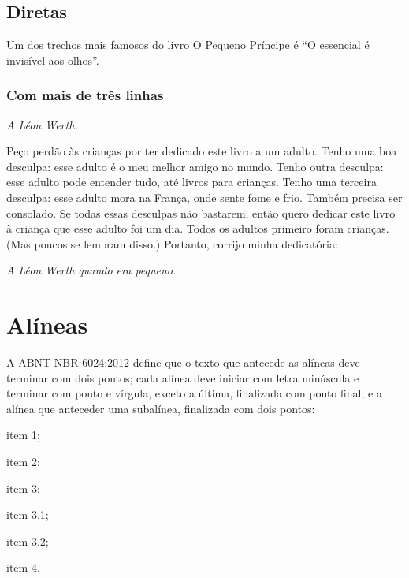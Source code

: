 \documentclass[serif, brazilian]{uffstex}
\begin{document}
\section{Diretas}

Um dos trechos mais famosos do livro O Pequeno Príncipe é \enquote{O essencial é invisível aos olhos}\cite[58]{exupery15}.

\subsection{Com mais de três linhas}

\begin{citacao}
\textit{A Léon Werth.}

Peço perdão às crianças por ter dedicado este livro a um adulto. Tenho uma boa desculpa: esse adulto é o meu melhor amigo no mundo. Tenho outra desculpa: esse adulto pode entender tudo, até livros para crianças. Tenho uma terceira desculpa: esse adulto mora na França, onde sente fome e frio. Também precisa ser consolado. Se todas essas desculpas não bastarem, então quero dedicar este livro à criança que esse adulto foi um dia. Todos os adultos primeiro foram crianças. (Mas poucos se lembram disso.) Portanto, corrijo minha dedicatória:

\textit{A Léon Werth quando era pequeno.} \cite{exupery15}
\end{citacao}

\chapter{Alíneas}

A ABNT NBR 6024:2012 define que o texto que antecede as alíneas deve terminar com dois pontos; cada alínea deve iniciar com letra minúscula e terminar com ponto e vírgula, exceto a última, finalizada com ponto final, e a alínea que anteceder uma subalínea, finalizada com dois pontos:

\begin{alineas}
  \item item 1;
  \item item 2;
  \item item 3:
  \begin{alineas} %
    \item item 3.1;
    \item item 3.2;
  \end{alineas}
  \item item 4.
\end{alineas}
\end{document}
